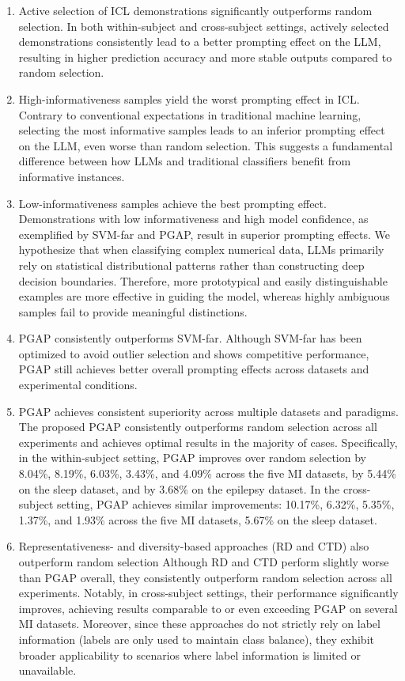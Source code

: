\documentclass[journal,twocolumn]{IEEEtran}
\begin{document}
\begin{enumerate}
  \item {Active selection of ICL demonstrations significantly outperforms random selection.} In both within-subject and cross-subject settings, actively selected demonstrations consistently lead to a better prompting effect on the LLM, resulting in higher prediction accuracy and more stable outputs compared to random selection.
  
  \item {High-informativeness samples yield the worst prompting effect in ICL.} Contrary to conventional expectations in traditional machine learning, selecting the most informative samples leads to an inferior prompting effect on the LLM, even worse than random selection. This suggests a fundamental difference between how LLMs and traditional classifiers benefit from informative instances.
  
  \item {Low-informativeness samples achieve the best prompting effect.} Demonstrations with low informativeness and high model confidence, as exemplified by SVM-far and PGAP, result in superior prompting effects. We hypothesize that when classifying complex numerical data, LLMs primarily rely on statistical distributional patterns rather than constructing deep decision boundaries. Therefore, more prototypical and easily distinguishable examples are more effective in guiding the model, whereas highly ambiguous samples fail to provide meaningful distinctions.
  
  \item {PGAP consistently outperforms SVM-far.} Although SVM-far has been optimized to avoid outlier selection and shows competitive performance, PGAP still achieves better overall prompting effects across datasets and experimental conditions.
  
  \item {PGAP achieves consistent superiority across multiple datasets and paradigms.} The proposed PGAP consistently outperforms random selection across all experiments and achieves optimal results in the majority of cases. Specifically, in the within-subject setting, PGAP improves over random selection by 8.04\%, 8.19\%, 6.03\%, 3.43\%, and 4.09\% across the five MI datasets, by 5.44\% on the sleep dataset, and by 3.68\% on the epilepsy dataset. In the cross-subject setting, PGAP achieves similar improvements: 10.17\%, 6.32\%, 5.35\%, 1.37\%, and 1.93\% across the five MI datasets, 5.67\% on the sleep dataset.
  
  \item {Representativeness- and diversity-based approaches (RD and CTD) also outperform random selection} Although RD and CTD perform slightly worse than PGAP overall, they consistently outperform random selection across all experiments. Notably, in cross-subject settings, their performance significantly improves, achieving results comparable to or even exceeding PGAP on several MI datasets. Moreover, since these approaches do not strictly rely on label information (labels are only used to maintain class balance), they exhibit broader applicability to scenarios where label information is limited or unavailable.
\end{enumerate}
\end{document}
